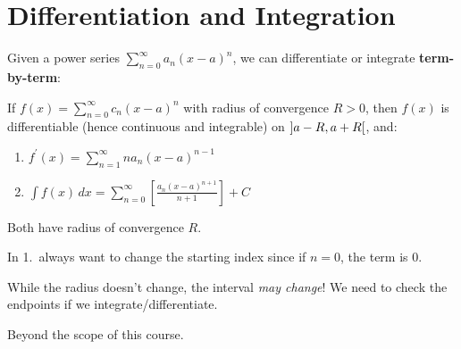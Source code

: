 \section{Differentiation and Integration}
Given a power series $ \sum\limits_{n=0}^{\infty} a_n(x-a)^n $,
we can differentiate or integrate \textbf{term-by-term}:
\begin{Theorem}{}{}
    If $ f(x)=\sum\limits_{n=0}^{\infty} c_n(x-a)^n $ with radius of convergence
    $ R>0 $, then $ f(x) $ is differentiable (hence continuous and integrable)
    on $ \interval[open]{a-R}{a+R} $, and:
    \begin{enumerate}
        \item $ \displaystyle f^\prime(x)=\sum\limits_{n=1}^{\infty} n a_n(x-a)^{n-1} $
        \item $ \displaystyle\int f(x)\, d{x} =\sum\limits_{n=0}^{\infty} \left[
                      \frac{a_n(x-a)^{n+1}}{n+1}
                      \right]+C $
    \end{enumerate}
    Both have radius of convergence $ R $.
\end{Theorem}

\begin{Remark}{}{}
    In 1.\ always want to change the starting index since if $ n=0 $, the term is $ 0 $.
\end{Remark}

\begin{Remark}{}{}
    While the radius doesn't change, the interval \emph{may change}! We need to check the endpoints
    if we integrate/differentiate.
\end{Remark}

\begin{Proof}{}{}
    Beyond the scope of this course.
\end{Proof}

